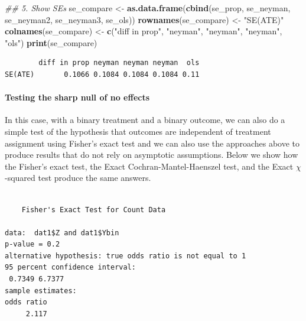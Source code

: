 \documentclass[
  12pt,
]{book}
\newenvironment{Shaded}{\begin{snugshade}}{\end{snugshade}}
\newcommand{\CommentTok}[1]{\textcolor[rgb]{0.56,0.35,0.01}{\textit{#1}}}
\newcommand{\DataTypeTok}[1]{\textcolor[rgb]{0.13,0.29,0.53}{#1}}
\newcommand{\KeywordTok}[1]{\textcolor[rgb]{0.13,0.29,0.53}{\textbf{#1}}}
\newcommand{\NormalTok}[1]{#1}
\newcommand{\OperatorTok}[1]{\textcolor[rgb]{0.81,0.36,0.00}{\textbf{#1}}}
\newcommand{\StringTok}[1]{\textcolor[rgb]{0.31,0.60,0.02}{#1}}
\let\oldparagraph\paragraph
\renewcommand{\paragraph}[1]{\oldparagraph{#1}\mbox{}}
\theoremstyle{definition}
\theoremstyle{definition}
\theoremstyle{definition}
\theoremstyle{remark}
\begin{document}
\begin{Shaded}
\begin{Highlighting}[]
\CommentTok{## 5. Show SEs}
\NormalTok{se_compare <-}\StringTok{ }\KeywordTok{as.data.frame}\NormalTok{(}\KeywordTok{cbind}\NormalTok{(se_prop, se_neyman, se_neyman2, se_neyman3, se_ols))}
\KeywordTok{rownames}\NormalTok{(se_compare) <-}\StringTok{ "SE(ATE)"}
\KeywordTok{colnames}\NormalTok{(se_compare) <-}\StringTok{ }\KeywordTok{c}\NormalTok{(}\StringTok{"diff in prop"}\NormalTok{, }\StringTok{"neyman"}\NormalTok{, }\StringTok{"neyman"}\NormalTok{, }\StringTok{"neyman"}\NormalTok{, }\StringTok{"ols"}\NormalTok{)}
\KeywordTok{print}\NormalTok{(se_compare)}
\end{Highlighting}
\end{Shaded}

\begin{verbatim}
        diff in prop neyman neyman neyman  ols
SE(ATE)       0.1066 0.1084 0.1084 0.1084 0.11
\end{verbatim}

\hypertarget{testing-the-sharp-null-of-no-effects-1}{%
\paragraph{Testing the sharp null of no
effects}\label{testing-the-sharp-null-of-no-effects-1}}

In this case, with a binary treatment and a binary outcome, we can also
do a simple test of the hypothesis that outcomes are independent of
treatment assignment using Fisher's exact test and we can also use the
approaches above to produce results that do not rely on asymptotic
assumptions. Below we show how the Fisher's exact test, the Exact
Cochran-Mantel-Haenszel test, and the Exact \(\chi\)-squared test
produce the same answers.

\begin{Shaded}
\end{Shaded}

\begin{verbatim}

    Fisher's Exact Test for Count Data

data:  dat1$Z and dat1$Ybin
p-value = 0.2
alternative hypothesis: true odds ratio is not equal to 1
95 percent confidence interval:
 0.7349 6.7377
sample estimates:
odds ratio 
     2.117 
\end{verbatim}
\end{document}
